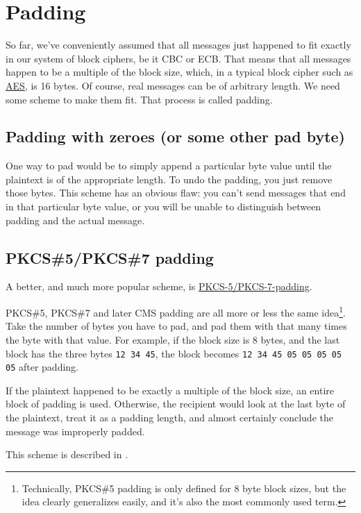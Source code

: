 \documentclass[11pt,ebook,table,dvipsnames]{memoir}
\begin{document}
\section{Padding}
\label{sec-2-3-8}

So far, we've conveniently assumed that all messages just happened to
fit exactly in our system of block ciphers, be it CBC or ECB. That
means that all messages happen to be a multiple of the block size,
which, in a typical block cipher such as \hyperref[AES]{AES}, is 16 bytes. Of course,
real messages can be of arbitrary length. We need some scheme to make
them fit. That process is called padding.

\subsection{Padding with zeroes (or some other pad byte)}
\label{sec-2-3-8-1}

One way to pad would be to simply append a particular byte value until
the plaintext is of the appropriate length. To undo the padding, you
just remove those bytes. This scheme has an obvious flaw: you can't
send messages that end in that particular byte value, or you will be
unable to distinguish between padding and the actual message.
\subsection{\label{PKCS-5/PKCS-7-padding}PKCS\#5/PKCS\#7 padding}
\label{sec-2-3-8-2}

A better, and much more popular scheme, is \hyperref[PKCS\#5/PKCS\#7 padding]{PKCS-5/PKCS-7-padding}.

PKCS\#5, PKCS\#7 and later CMS padding are all more or less the same
idea\footnote{Technically, PKCS\#5 padding is only defined for 8 byte block
sizes, but the idea clearly generalizes easily, and it's also the most
commonly used term.}. Take the number of bytes you have to pad, and
pad them with that many times the byte with that value. For example,
if the block size is 8 bytes, and the last block has the three bytes
\texttt{12 34 45}, the block becomes \texttt{12 34 45 05 05 05 05 05} after padding.

If the plaintext happened to be exactly a multiple of the block size,
an entire block of padding is used. Otherwise, the recipient would
look at the last byte of the plaintext, treat it as a padding length,
and almost certainly conclude the message was improperly padded.

This scheme is described in \cite{cms:padding}.
\end{document}
